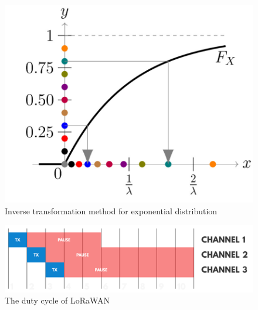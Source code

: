 \begin{figure}[H]
    \centering
    \includegraphics[width=0.7\linewidth]{images/countermeasures/inverse_transformation_method_for_exponential_distribution.jpg}
    \caption{Inverse transformation method for exponential distribution}
    \label{fig:distribution}
\end{figure}

\begin{figure}[H]
    \centering
    \includegraphics[width=0.7\linewidth]{images/countermeasures/duty_cycle.png}
    \caption{The duty cycle of LoRaWAN}
    \label{fig:duty_cycle}
\end{figure}